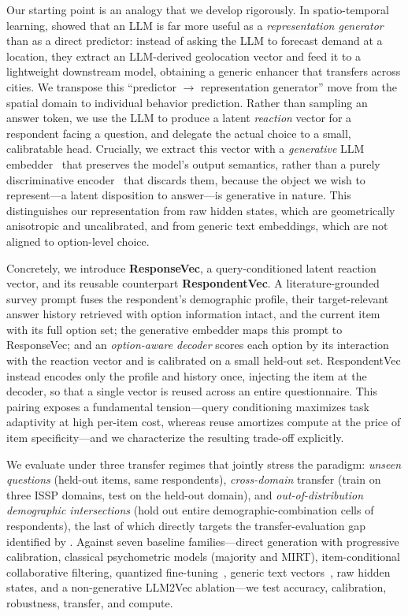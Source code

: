 Our starting point is an analogy that we develop rigorously. In spatio-temporal learning, \citet{he2025geolocation} showed that an LLM is far more useful as a \emph{representation generator} than as a direct predictor: instead of asking the LLM to forecast demand at a location, they extract an LLM-derived geolocation vector and feed it to a lightweight downstream model, obtaining a generic enhancer that transfers across cities. We transpose this ``predictor $\rightarrow$ representation generator'' move from the spatial domain to individual behavior prediction. Rather than sampling an answer token, we use the LLM to produce a latent \emph{reaction} vector for a respondent facing a question, and delegate the actual choice to a small, calibratable head. Crucially, we extract this vector with a \emph{generative} LLM embedder~\citep{behnamghader2026llmvecgen} that preserves the model's output semantics, rather than a purely discriminative encoder~\citep{behnamghader2024llmvec} that discards them, because the object we wish to represent---a latent disposition to answer---is generative in nature. This distinguishes our representation from raw hidden states, which are geometrically anisotropic and uncalibrated, and from generic text embeddings, which are not aligned to option-level choice.

Concretely, we introduce \textbf{ResponseVec}, a query-conditioned latent reaction vector, and its reusable counterpart \textbf{RespondentVec}. A literature-grounded survey prompt fuses the respondent's demographic profile, their target-relevant answer history retrieved with option information intact, and the current item with its full option set; the generative embedder maps this prompt to ResponseVec; and an \emph{option-aware decoder} scores each option by its interaction with the reaction vector and is calibrated on a small held-out set. RespondentVec instead encodes only the profile and history once, injecting the item at the decoder, so that a single vector is reused across an entire questionnaire. This pairing exposes a fundamental tension---query conditioning maximizes task adaptivity at high per-item cost, whereas reuse amortizes compute at the price of item specificity---and we characterize the resulting trade-off explicitly.

We evaluate under three transfer regimes that jointly stress the paradigm: \emph{unseen questions} (held-out items, same respondents), \emph{cross-domain} transfer (train on three ISSP domains, test on the held-out domain), and \emph{out-of-distribution demographic intersections} (hold out entire demographic-combination cells of respondents), the last of which directly targets the transfer-evaluation gap identified by \citet{ku2026silicon}. Against seven baseline families---direct generation with progressive calibration, classical psychometric models (majority and MIRT), item-conditional collaborative filtering, quantized fine-tuning~\citep{mao2024survey,song2025enhancing}, generic text vectors~\citep{wang2024multilingual}, raw hidden states, and a non-generative LLM2Vec ablation---we test accuracy, calibration, robustness, transfer, and compute.

